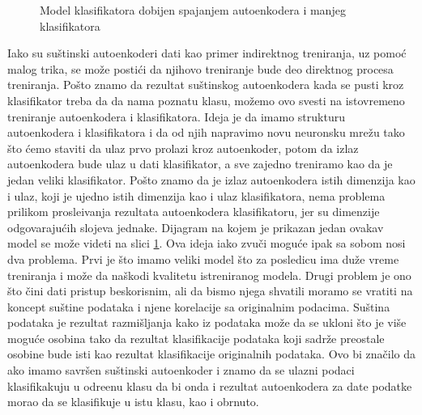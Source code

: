 \documentclass{article}
\begin{document}
\begin{figure}[h!]
		\caption{Model klasifikatora dobijen spajanjem autoenkodera i manjeg klasifikatora}
		\label{autoencoder-classifier-model-combination}
	\end{figure}

	Iako su su\v stinski autoenkoderi dati kao primer indirektnog treniranja, uz pomo\'c malog trika, se mo\v ze posti\'ci da njihovo treniranje bude deo direktnog procesa treniranja.
	Po\v sto znamo da rezultat su\v stinskog autoenkodera kada se pusti kroz klasifikator treba da da nama poznatu klasu, mo\v zemo ovo svesti na istovremeno treniranje autoenkodera i klasifikatora.
	Ideja je da imamo strukturu autoenkodera i klasifikatora i da od njih napravimo novu neuronsku mre\v zu tako \v sto \'cemo staviti da ulaz prvo prolazi kroz autoenkoder, potom da izlaz autoenkodera bude ulaz u dati klasifikator, a sve zajedno treniramo kao da je jedan veliki klasifikator.
	Po\v sto znamo da je izlaz autoenkodera istih dimenzija kao i ulaz, koji je ujedno istih dimenzija kao i ulaz klasifikatora, nema problema prilikom prosle\dj ivanja rezultata autoenkodera klasifikatoru, jer su dimenzije odgovaraju\'cih slojeva jednake.
	Dijagram na kojem je prikazan jedan ovakav model se mo\v ze videti na slici \ref{autoencoder-classifier-model-combination}.
	Ova ideja iako zvu\v ci mogu\'ce ipak sa sobom nosi dva problema.
	Prvi je \v sto imamo veliki model \v sto za posledicu ima du\v ze vreme treniranja i mo\v ze da na\v skodi kvalitetu istreniranog modela.
	Drugi problem je ono \v sto \v cini dati pristup beskorisnim, ali da bismo njega shvatili moramo se vratiti na koncept su\v stine podataka i njene korelacije sa originalnim podacima.
	Su\v stina podataka je rezultat razmi\v sljanja kako iz podataka mo\v ze da se ukloni \v sto je vi\v se mogu\'ce osobina tako da rezultat klasifikacije podataka koji sadr\v ze preostale osobine bude isti kao rezultat klasifikacije originalnih podataka.
	Ovo bi zna\v cilo da ako imamo savr\v sen su\v stinski autoenkoder i znamo da se ulazni podaci klasifikakuju u odre\dj enu klasu da bi onda i rezultat autoenkodera za date podatke morao da se klasifikuje u istu klasu, kao i obrnuto.
\end{document}
